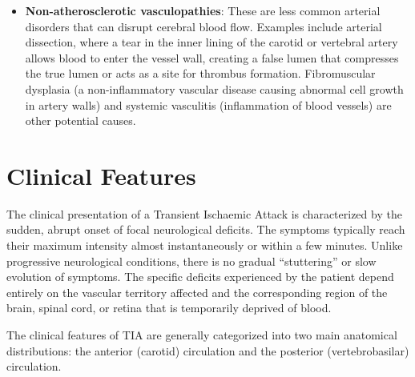 \begin{itemize}
    \item \textbf{Non-atherosclerotic vasculopathies}: These are less common arterial disorders that can disrupt cerebral blood flow. Examples include arterial dissection, where a tear in the inner lining of the carotid or vertebral artery allows blood to enter the vessel wall, creating a false lumen that compresses the true lumen or acts as a site for thrombus formation. Fibromuscular dysplasia (a non-inflammatory vascular disease causing abnormal cell growth in artery walls) and systemic vasculitis (inflammation of blood vessels) are other potential causes.
\end{itemize}

\section*{Clinical Features}
The clinical presentation of a Transient Ischaemic Attack is characterized by the sudden, abrupt onset of focal neurological deficits. The symptoms typically reach their maximum intensity almost instantaneously or within a few minutes. Unlike progressive neurological conditions, there is no gradual ``stuttering'' or slow evolution of symptoms. The specific deficits experienced by the patient depend entirely on the vascular territory affected and the corresponding region of the brain, spinal cord, or retina that is temporarily deprived of blood.

The clinical features of TIA are generally categorized into two main anatomical distributions: the anterior (carotid) circulation and the posterior (vertebrobasilar) circulation.

